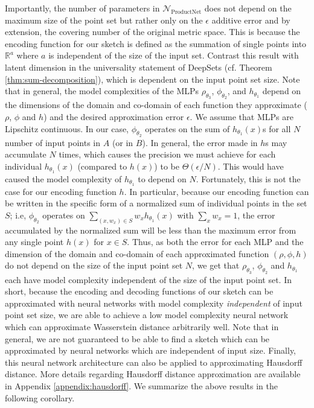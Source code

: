 \documentclass[12pt]{article}
\newcommand{\R}{\mathbb R}
\newcommand{\Network}{\mathcal{N}_{\mathrm{ProductNet}}}
\begin{document}
Importantly, the number of parameters in $\Network$ does not depend on the maximum size of the point set but rather only on the $\epsilon$ additive error and by extension, the covering number of the original metric space.
This is because the encoding function for our sketch is defined as the summation of single points into $\R^a$ where $a$ is independent of the size of the input set. Contrast this result with latent dimension in the universality statement of DeepSets (cf. Theorem \ref{thm:sum-decomposition}), which is dependent on the input point set size. 
Note that in general, the model complexities of the MLPs $\rho_{\theta_3}$, $\phi_{\theta_2}$, and $h_{\theta_1}$ depend on the dimensions of the domain and co-domain of each function they approximate ($\rho$, $\phi$ and $h$) and the desired approximation error $\epsilon$.
We assume that MLPs are Lipschitz continuous. 
In our case, $\phi_{\theta_2}$ operates on the 
sum of $h_{\theta_1}(x)$s for all $N$ number of input points in $A$ (or in $B$). In general, the error made in $h$s may accumulate $N$ times, which causes the precision we must achieve for each individual $h_{\theta_1}(x)$ (compared to $h(x)$) to be $\Theta(\epsilon / N)$. This would have caused the model complexity of $h_{\theta_1}$ to depend on $N$.  
Fortunately, this is not the case for our encoding function $h$. In particular, because our encoding function can be written in the specific form of a normalized sum of individual points in the set $S$;  i.e, $\phi_{\theta_2}$ operates on $\sum_{(x,w_x)\in S} w_x h_{\theta_1}(x)$ with $\sum_x w_x = 1$, the error accumulated by the normalized sum will be less than the maximum error from any single point $h(x)$ for $x\in S$. Thus, as both the error for each MLP and the dimension of the domain and co-domain of each approximated function $(\rho, \phi, h)$ do not depend on the size of the input point set $N$, we get that $\rho_{\theta_3}$, $\phi_{\theta_2}$ and $h_{\theta_1}$ each have model complexity independent of the size of the input point set.
In short, because the encoding and decoding functions of our sketch can be approximated with neural networks with model complexity \textit{independent} of input point set size, we are able to achieve a low model complexity neural network which can approximate Wasserstein distance arbitrarily well. 
Note that in general, we are not guaranteed to be able to find a sketch which can be approximated by neural networks which are independent of input size.
Finally, this neural network architecture can also be applied to approximating Hausdorff distance. More details regarding Hausdorff distance approximation are available in Appendix \ref{appendix:hausdorff}.
We summarize the above results in the following corollary. 
\end{document}
